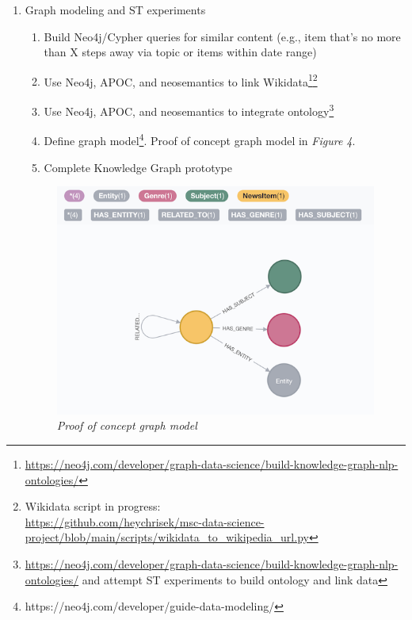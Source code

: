 \documentclass[11pt]{article}
\begin{document}
\begin{enumerate}
\begin{enumerate}
  \end{enumerate}
\item{Graph modeling and ST experiments} \label{sec:PropGraphModeling}
  \begin{enumerate}
  \item Build Neo4j/Cypher queries for similar content (e.g., item that’s no more than X steps away via topic or items within date range)
  \item Use Neo4j, APOC, and neosemantics to link Wikidata\footnote{\url{https://neo4j.com/developer/graph-data-science/build-knowledge-graph-nlp-ontologies/}}\footnote{Wikidata script in progress:\\ \url{https://github.com/heychrisek/msc-data-science-project/blob/main/scripts/wikidata_to_wikipedia_url.py}}
  \item Use Neo4j, APOC, and neosemantics to integrate ontology\footnote{\url{https://neo4j.com/developer/graph-data-science/build-knowledge-graph-nlp-ontologies/} and attempt ST experiments to build ontology and link data}
  \item Define graph model\footnote{https://neo4j.com/developer/guide-data-modeling/}. Proof of concept graph model in \textit{Figure 4}.
  \item Complete Knowledge Graph prototype
  \end{enumerate}

\begin{figure}
\centerline{\includegraphics{graph-model}}
\caption{\textit{Proof of concept graph model}}
\end{figure}


\end{enumerate}
\end{document}

